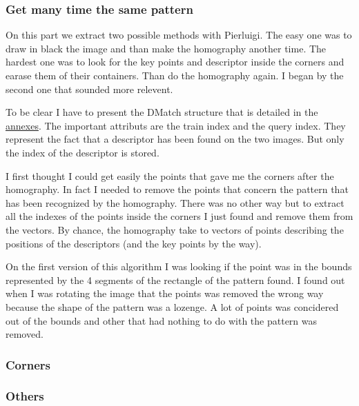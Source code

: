 \documentclass[english,a4paper,11pt]{report}
\begin{document}
	\subsubsection[Multiple pattern]{Get many time the same pattern}

	\par On this part we extract two possible methods with Pierluigi. The easy one was to draw in black the image and than make the homography another time. The hardest one was to look for the key points and descriptor inside the corners and earase them of their containers. Than do the homography again. I began by the second one that sounded more relevent. 
	
	\par To be clear I have to present the DMatch structure that is detailed in the \hyperlink{structDMatch}{annexes}. The important attributs are the train index and the query index. They represent the fact that a descriptor has been found on the two images. But only the index of the descriptor is stored.
	
	\par I first thought I could get easily the points that gave me the corners after the homography. In fact I needed to remove the points that concern the pattern that has been recognized by the homography. There was no other way but to extract all the indexes of the points inside the corners I just found and remove them from the vectors. By chance, the homography take to vectors of points describing the positions of the descriptors (and the key points by the way). 
	\par On the first version of this algorithm I was looking if the point was in the bounds represented by the 4 segments of the rectangle of the pattern found. I found out when I was rotating the image that the points was removed the wrong way because the shape of the pattern was a lozenge. A lot of points was concidered out of the bounds and other that had nothing to do with the pattern was removed.
	\par 
	
	\subsubsection{Corners}
	
	\subsubsection{Others}
	
	
\end{document}
